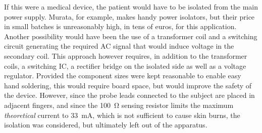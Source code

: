 \documentclass[a4paper,11pt]{article}
\begin{document}
If this were a medical device, the patient would have to be isolated
from the main power supply. Murata, for example, makes handy power
isolators, but their price in small batches is unreasonably high, in
tens of euros, for this application. Another possibility would have
been the use of a transformer coil and a switching circuit generating
the required AC signal that would induce voltage in the secondary
coil. This approach however requires, in addition to the transformer
coils, a switching IC, a rectifier bridge on the isolated side as well
as a voltage regulator. Provided the component sizes were kept
reasonable to enable easy hand soldering, this would require board
space, but would improve the safety of the device. However, since the
probe leads connected to the subject are placed in adjacent fingers,
and since the \SI{100}{\ohm} sensing resistor limits the maximum
\emph{theoretical} current to \SI{33}{\milli\ampere}, which is not
sufficient to cause skin burns, the isolation was considered, but
ultimately left out of the apparatus.


\end{document}
